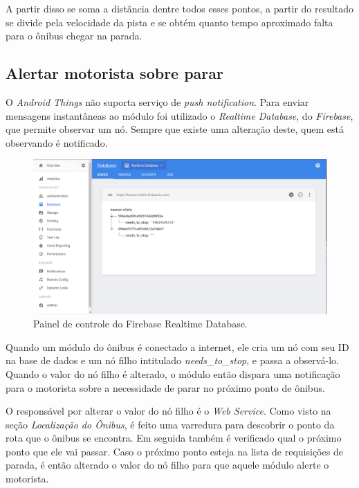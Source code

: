 \documentclass[
	12pt,				%
	oneside,			%
	a4paper,			%
	brazil				%
]{abntex2}
\begin{document}
{A partir disso se soma a distância dentre todos esses pontos, a partir do resultado se divide pela velocidade da pista e se obtém quanto tempo aproximado falta para o ônibus chegar na parada.

\subsection{Alertar motorista sobre parar}

O \textit{Android Things} não suporta serviço de \textit{push notification}. Para enviar mensagens instantâneas ao módulo foi utilizado o \textit{Realtime Database}, do \textit{Firebase}, que permite observar um nó. Sempre que existe uma alteração deste, quem está observando é notificado.

\begin{figure}[H]
\centering
\includegraphics[width=15cm, center]{images/realtime-database}
\caption{Painel de controle do Firebase Realtime Database.}
\label{Rotulo}
\end{figure}

Quando um módulo do ônibus é conectado a internet, ele cria um nó com seu ID na base de dados e um nó filho intitulado \textit{needs\_to\_stop}, e passa a observá-lo. Quando o valor do nó filho é alterado, o módulo então dispara uma notificação para o motorista sobre a necessidade de parar no próximo ponto de ônibus.

O responsável por alterar o valor do nó filho é o \textit{Web Service}. Como visto na seção \textit{Localização do Ônibus}, é feito uma varredura para descobrir o ponto da rota que o ônibus se encontra. Em seguida também é verificado qual o próximo ponto que ele vai passar. Caso o próximo ponto esteja na lista de requisições de parada, é então alterado o valor do nó filho para que aquele módulo alerte o motorista.

}
\end{document}
